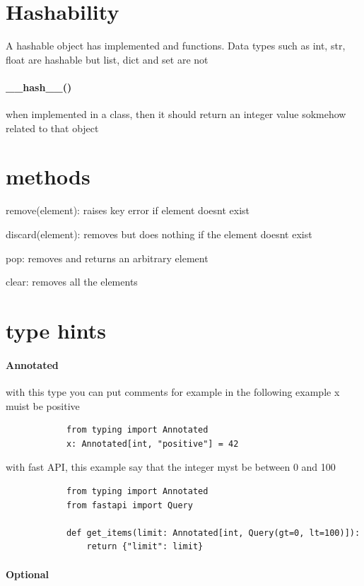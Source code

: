 \section{Hashability}
    A hashable object has implemented  and  functions. Data types such as int, str, float are hashable but list, dict and set are not
    \paragraph{\_\_hash\_\_()}
        when implemented in a class, then it should return an  integer value sokmehow related to that object

\section{methods}
    
    remove(element): raises key error if element doesnt exist
    
    discard(element): removes but does nothing if the element doesnt exist
    
    pop: removes and returns an arbitrary element
    
    clear: removes all the elements

\section{type hints}
    \paragraph{Annotated}
        with this type you can put comments for example in the following example x muist be positive
        \begin{verbatim}
            from typing import Annotated
            x: Annotated[int, "positive"] = 42
        \end{verbatim}
        with fast API, this example say that the integer myst be between 0 and 100
        \begin{verbatim}
            from typing import Annotated
            from fastapi import Query
            
            def get_items(limit: Annotated[int, Query(gt=0, lt=100)]):
                return {"limit": limit}
        \end{verbatim}

    \paragraph{Optional}
        
